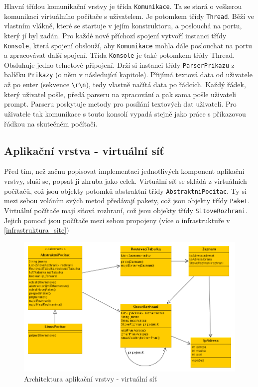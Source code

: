 Hlavní třídou komunikační vrstvy je třída \verb|Komunikace|. Ta se stará o veškerou komunikaci virtuálního počítače s uživatelem. Je potomkem třídy \verb|Thread|. Běží ve vlastním vlákně, které se startuje v jejím konstruktoru, a poslouchá na portu, který jí byl zadán. Pro každé nové příchozí spojení vytvoří instanci třídy \verb|Konsole|, která spojení obslouží, aby \verb|Komunikace| mohla dále poslouchat na portu a zpracovávat další spojení. Třída \verb|Konsole| je také potomkem třídy Thread. Obsluhuje jedno telnetové připojení. Drží si instanci třídy \verb|ParserPrikazu| z balíčku \verb|Prikazy| (o něm v následující kapitole). Přijímá textová data od uživatele až po enter (sekvence \verb|\r\n|), tedy vlastně načítá data po řádcích. Každý řádek, který uživatel pošle, předá parseru na zpracování a pak sama pošle uživateli prompt. Parseru poskytuje metody pro posílání textových dat uživateli. Pro uživatele tak komunikace s touto konsolí vypadá stejně jako práce s příkazovou řádkou na skutečném počítači.


\subsection{Aplikační vrstva - virtuální síť}

Před tím, než začnu popisovat implementaci jednotlivých komponent aplikační vrstvy, sluší se, popsat ji zhruba jako celek. Virtuální síť se skládá z virtuálních počítačů, což jsou objekty potomků abstraktní třídy \verb|AbstraktniPocitac|. Ty si mezi sebou voláním svých metod předávají pakety, což jsou objekty třídy \verb|Paket|. Virtuální počítače mají síťová rozhraní, což jsou objekty třídy \verb|SitoveRozhrani|. Jejich pomocí jsou počítače mezi sebou propojeny (více o infrastruktuře v \ref{infrastruktura_site})

\begin{figure}[h]
\begin{center}
\includegraphics[width=14cm]{obrazky/virtualni_sit}
\caption{Architektura aplikační vrstvy - virtuální síť}
\label{obr_virtualni_sit}
\end{center}
\end{figure}




